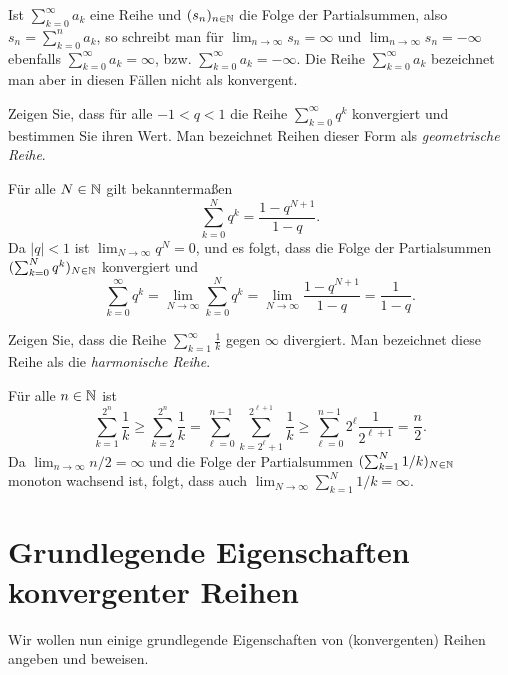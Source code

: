 \documentclass[a4paper,10pt]{article}
\begin{document}
\begin{bem}
 Ist $\sum_{k=0}^\infty a_k$ eine Reihe und $(s_n)_{n \in \mathbb{N}}$ die Folge der Partialsummen, also $s_n = \sum_{k=0}^n a_k$, so schreibt man für $\lim_{n \to \infty} s_n = \infty$ und $\lim_{n \to \infty} s_n = -\infty$ ebenfalls $\sum_{k=0}^\infty a_k = \infty$, bzw. $\sum_{k=0}^\infty a_k = -\infty$. Die Reihe $\sum_{k=0}^\infty a_k$ bezeichnet man aber in diesen Fällen nicht als konvergent.
\end{bem}


\begin{question}
 Zeigen Sie, dass für alle $-1 < q < 1$ die Reihe $\sum_{k=0}^\infty q^k$ konvergiert und  bestimmen Sie ihren Wert. Man bezeichnet Reihen dieser Form als \emph{geometrische Reihe}.
\end{question}
\begin{solution}
 Für alle $N \in \mathbb{N}$ gilt bekanntermaßen
 \[
  \sum_{k=0}^N q^k = \frac{1-q^{N+1}}{1-q}.
 \]
 Da $|q| < 1$ ist $\lim_{N \to \infty} q^N = 0$, und es folgt, dass die Folge der Partialsummen $(\sum_{k=0}^N q^k)_{N \in \mathbb{N}}$ konvergiert und
 \[
  \sum_{k=0}^\infty q^k
  = \lim_{N \to \infty} \sum_{k=0}^N q^k
  = \lim_{N \to \infty} \frac{1-q^{N+1}}{1-q}
  = \frac{1}{1-q}.
 \]
\end{solution}


\begin{question}
 Zeigen Sie, dass die Reihe $\sum_{k=1}^\infty \frac{1}{k}$ gegen $\infty$ divergiert. Man bezeichnet diese Reihe als die \emph{harmonische Reihe}.
\end{question}
\begin{solution}
 Für alle $n \in \mathbb{N}$ ist
 \[
  \sum_{k=1}^{2^n} \frac{1}{k}
  \geq \sum_{k=2}^{2^n} \frac{1}{k}
  = \sum_{\ell=0}^{n-1} \sum_{k=2^\ell+1}^{2^{\ell+1}} \frac{1}{k}
  \geq \sum_{\ell=0}^{n-1} 2^\ell \frac{1}{2^{\ell+1}}
  = \frac{n}{2}.
 \]
 Da $\lim_{n \to \infty} n/2 = \infty$ und die Folge der Partialsummen $(\sum_{k=1}^N 1/k)_{N \in \mathbb{N}}$ monoton wachsend ist, folgt, dass auch $\lim_{N \to \infty} \sum_{k=1}^N 1/k = \infty$.
\end{solution}





\section{Grundlegende Eigenschaften konvergenter Reihen}


Wir wollen nun einige grundlegende Eigenschaften von (konvergenten) Reihen angeben und beweisen.
\end{document}
